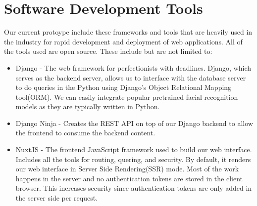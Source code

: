 \section{Software Development Tools}
\label{sec:devtools}
 Our current protoype include these frameworks and tools that are heavily used in the industry for rapid development and deployment of web applications. All of the tools used are open source. These include but are not limited to:
 
\begin{itemize}
	\item	Django - The web framework for perfectionists with deadlines. Django, which serves as the backend server, allows us to interface with the database server to do queries in the Python using Django's Object Relational Mapping tool(ORM). We can easily integrate popular pretrained facial recognition models as they are typically written in Python.
\end{itemize}

\begin{itemize}
	\item	Django Ninja - Creates the REST API on top of our Django backend to allow the frontend to consume the backend content.
\end{itemize}

\begin{itemize}
	\item	NuxtJS - The frontend JavaScript framework used to build our web interface. Includes all the tools for routing, quering, and security. By default, it renders our web interface in Server Side Rendering(SSR) mode. Most of the work happens in the server and no authentication tokens are stored in the client browser. This increases security since authentication tokens are only added in the server side per request.
\end{itemize}
	
